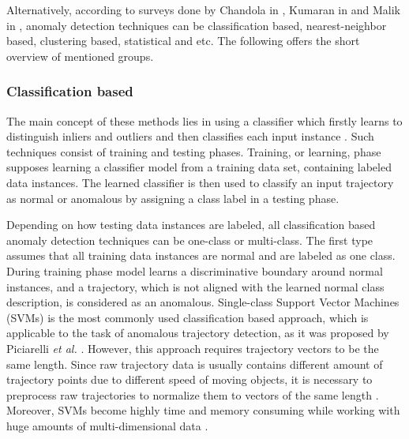 Alternatively, according to surveys done by Chandola in \cite{article:15_survey_ad}, Kumaran in \cite{article:6_survey_anom_det_rtuvs} and Malik in \cite{article:comp_analys_odt}, anomaly detection techniques can be classification based, nearest-neighbor based, clustering based, statistical and etc. The following offers the short overview of mentioned groups.

\subsubsection{Classification based}

The main concept of these methods lies in using a classifier which firstly learns to distinguish inliers and outliers and then classifies each input instance \cite{inproceedings:18_ardod_lstd}. Such techniques consist of training and testing phases. Training, or learning, phase supposes learning a classifier model from a training data set, containing labeled data instances. The learned classifier is then used to classify an input trajectory as normal or anomalous by assigning a class label in a testing phase.

Depending on how testing data instances are labeled, all classification based anomaly detection techniques can be one-class or multi-class. The first type assumes that all training data instances are normal and are labeled as one class. During training phase model learns a discriminative boundary around normal instances, and a trajectory, which is not aligned with the learned normal class description, is considered as an anomalous. Single-class Support Vector Machines (SVMs) is the most commonly used classification based approach, which is applicable to the task of anomalous trajectory detection, as it was proposed by Piciarelli \textit{et al.} \cite{inproceedings:16_va_tad_svm}\cite{article:17_tbaed}. However, this approach requires trajectory vectors to be the same length. Since raw trajectory data is usually contains different amount of trajectory points due to different speed of moving objects, it is necessary to preprocess raw trajectories to normalize them to vectors of the same length \cite{article:17_tbaed}. Moreover, SVMs become highly time and memory consuming while working with huge amounts of multi-dimensional data \cite{article:22_survey_dscc}.

